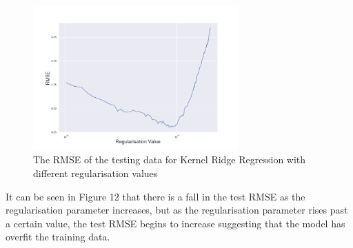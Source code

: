 \documentclass[a4paper,11pt,twoside]{article}
\begin{document}
      \begin{figure}[!htb]
        \centerline{\includegraphics[width=0.7\textwidth]
        {../errvals.png}}
        \caption{\label{fig:my-label} The RMSE of the testing data for Kernel Ridge Regression with different regularisation values}
      \end{figure}


It can be seen in Figure 12 that there is a fall in the test RMSE as the regularisation parameter increases, but as the regularisation parameter rises past a certain value, the test RMSE begins to increase suggesting that the model has overfit the training data.
\end{document}
